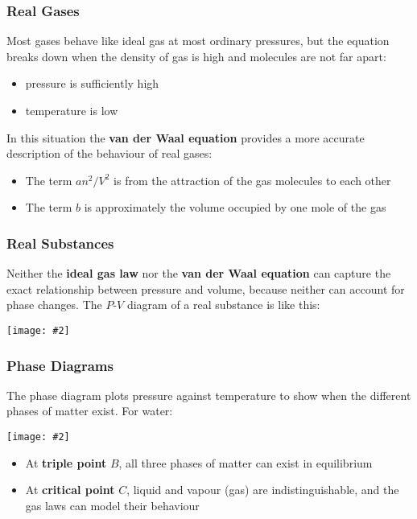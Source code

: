 \documentclass[12pt,aspectratio=169]{beamer}
\newcommand{\pic}[2]{\texttt{[image: \#2]}}
\newcommand{\eq}[2]{\vspace{#1}{\Large\begin{displaymath}#2\end{displaymath}}}
\begin{document}
\begin{frame}
  \frametitle{Real Gases}
  Most gases behave like ideal gas at most ordinary pressures, but the
  equation breaks down when the density of gas is high and molecules are not
  far apart:
  \begin{itemize}
  \item pressure is sufficiently high
  \item temperature is low
  \end{itemize}
  In this situation the \textbf{van der Waal equation} provides a more accurate
  description of the behaviour of real gases:

  \eq{-.2in}{
    \boxed{\left(P+\frac{an^2}{V^2}\right)(V-bn)=nRT}
  }

  \begin{itemize}
  \item The term $an^2/V^2$ is from the attraction of the gas molecules to each
    other
  \item The term $b$ is approximately the volume occupied by one mole of the gas
  \end{itemize}
\end{frame}




\begin{frame}
  \frametitle{Real Substances}
  Neither the \textbf{ideal gas law} nor the \textbf{van der Waal equation}
  can capture the exact relationship between pressure and volume, because
  neither can account for phase changes. The $P$-$V$ diagram of a real substance
  is like this:
  \begin{center}
    \pic{.35}{realsubstance.jpg}
  \end{center}
\end{frame}


\begin{frame}
  \frametitle{Phase Diagrams}
  The phase diagram plots pressure against temperature to show when the
  different phases of matter exist. For water:
  \begin{center}
    \vspace{-.1in}
    \pic{.4}{10-figure-31.png}
  \end{center}
  \begin{itemize}
  \item\vspace{-.15in} At \textbf{triple point} $B$, all three phases of matter
    can exist in equilibrium
  \item At \textbf{critical point} $C$, liquid and vapour (gas) are
    indistinguishable, and the gas laws can model their behaviour
  \end{itemize}
\end{frame}
\end{document}
